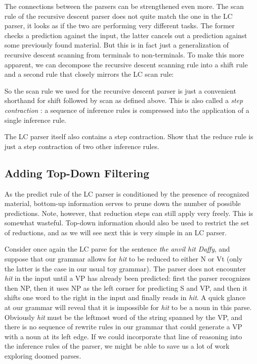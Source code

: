 The connections between the parsers can be strengthened even more.
The scan rule of the recursive descent parser does not quite match the one in the LC parser, it looks as if the two are performing very different tasks.
The former checks a prediction against the input, the latter cancels out a prediction against some previously found material.
But this is in fact just a generalization of recursive descent scanning from terminals to non-terminals.
To make this more apparent, we can decompose the recursive descent scanning rule into a shift rule and a second rule that closely mirrors the LC scan rule:
%
\begin{prooftree}
\end{prooftree}
%
\begin{prooftree}
\end{prooftree}
%
So the scan rule we used for the recursive descent parser is just a convenient shorthand for shift followed by scan as defined above.
This is also called a \emph{step contraction} \citep{Sikkel97}: a sequence of inference rules is compressed into the application of a single inference rule.

\begin{exercise}
    The LC parser itself also contains a step contraction.
    Show that the reduce rule is just a step contraction of two other inference rules.
\end{exercise}

\subsection{Adding Top-Down Filtering}
As the predict rule of the LC parser is conditioned by the presence of recognized material, bottom-up information serves to prune down the number of possible predictions.
Note, however, that reduction steps can still apply very freely.
This is somewhat wasteful.
Top-down information should also be used to restrict the set of reductions, and as we will see next this is very simple in an LC parser.

Consider once again the LC parse for the sentence \emph{the anvil hit Daffy}, and suppose that our grammar allows for \emph{hit} to be reduced to either N or Vt (only the latter is the case in our usual toy grammar).
The parser does not encounter \emph{hit} in the input until a VP has already been predicted: first the parser recognizes then NP, then it uses NP as the left corner for predicting S and VP, and then it shifts one word to the right in the input and finally reads in \emph{hit}.
A quick glance at our grammar will reveal that it is impossible for \emph{hit} to be a noun in this parse.
Obviously \emph{hit} must be the leftmost word of the string spanned by the VP, and there is no sequence of rewrite rules in our grammar that could generate a VP with a noun at its left edge.
If we could incorporate that line of reasoning into the inference rules of the parser, we might be able to save us a lot of work exploring doomed parses.

